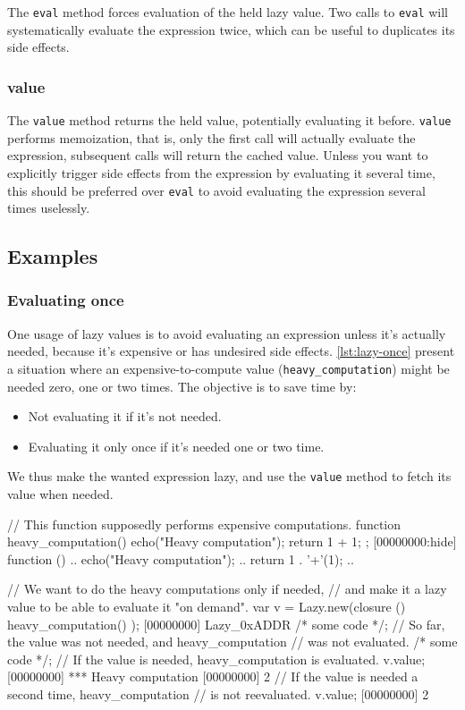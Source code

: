The \lstinline|eval| method forces evaluation of the held lazy
value. Two calls to \lstinline|eval| will systematically evaluate the
expression twice, which can be useful to duplicates its side effects.

\subsubsection{value}

The \lstinline|value| method returns the held value, potentially
evaluating it before. \lstinline|value| performs memoization, that is,
only the first call will actually evaluate the expression, subsequent
calls will return the cached value. Unless you want to explicitly
trigger side effects from the expression by evaluating it several
time, this should be preferred over \lstinline|eval| to avoid
evaluating the expression several times uselessly.

\subsection{Examples}

\subsubsection{Evaluating once}

One usage of lazy values is to avoid evaluating an expression unless
it's actually needed, because it's expensive or has undesired side
effects. \autoref{lst:lazy-once} present a situation where an
expensive-to-compute value (\lstinline|heavy_computation|) might be
needed zero, one or two times. The objective is to save time by:

\begin{itemize}
\item Not evaluating it if it's not needed.
\item Evaluating it only once if it's needed one or two time.
\end{itemize}

We thus make the wanted expression lazy, and use the \lstinline|value|
method to fetch its value when needed.

\begin{urbiscript}[caption=, label=lst:lazy-once, float=\floatpos]
// This function supposedly performs expensive computations.
function heavy_computation()
{
  echo("Heavy computation");
  return 1 + 1;
};
[00000000:hide] function () {
..  echo("Heavy computation");
..  return 1 . '+'(1);
..}

// We want to do the heavy computations only if needed,
// and make it a lazy value to be able to evaluate it "on demand".
var v = Lazy.new(closure () { heavy_computation() });
[00000000] Lazy_0xADDR
/* some code */;
// So far, the value was not needed, and heavy_computation
// was not evaluated.
/* some code */;
// If the value is needed, heavy_computation is evaluated.
v.value;
[00000000] *** Heavy computation
[00000000] 2
// If the value is needed a second time, heavy_computation
// is not reevaluated.
v.value;
[00000000] 2
\end{urbiscript}

